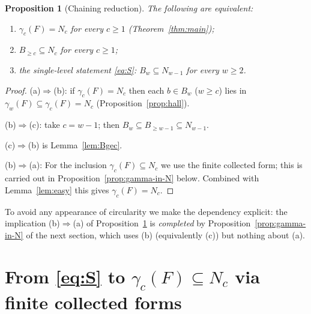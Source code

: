 \documentclass{amsart}
\newtheorem{proposition}{Proposition}
\theoremstyle{definition}
\theoremstyle{remark}
\begin{document}
\begin{proposition}[Chaining reduction]\label{prop:chain}
The following are equivalent:
\begin{enumerate}
\item[\textup{(a)}] $\gamma_c(F)=N_c$ for every $c\ge1$ \textup{(Theorem~\ref{thm:main})};
\item[\textup{(b)}] $B_{\ge c}\subseteq N_c$ for every $c\ge1$;
\item[\textup{(c)}] the single-level statement \eqref{eq:S}: $B_w\subseteq N_{w-1}$ for every $w\ge2$.
\end{enumerate}
\end{proposition}
\begin{proof}
(a)$\Rightarrow$(b): if $\gamma_c(F)=N_c$ then each $b\in B_w$ ($w\ge c$) lies in
$\gamma_w(F)\subseteq\gamma_c(F)=N_c$ (Proposition~\ref{prop:hall}).

(b)$\Rightarrow$(c): take $c=w-1$; then $B_w\subseteq B_{\ge w-1}\subseteq N_{w-1}$.

(c)$\Rightarrow$(b) is Lemma~\ref{lem:Bgec}.

(b)$\Rightarrow$(a): For the inclusion $\gamma_c(F)\subseteq N_c$ we use the
finite collected form; this is carried out in
Proposition~\ref{prop:gamma-in-N} below. Combined with Lemma~\ref{lem:easy} this
gives $\gamma_c(F)=N_c$.
\end{proof}

\noindent To avoid any appearance of circularity we make the dependency explicit:
the implication (b)$\Rightarrow$(a) of Proposition~\ref{prop:chain} is
\emph{completed} by Proposition~\ref{prop:gamma-in-N} of the next section, which
uses (b) (equivalently (c)) but nothing about (a).

\section{From \eqref{eq:S} to $\gamma_c(F)\subseteq N_c$ via finite collected forms}
\label{sec:collect}
\end{document}
